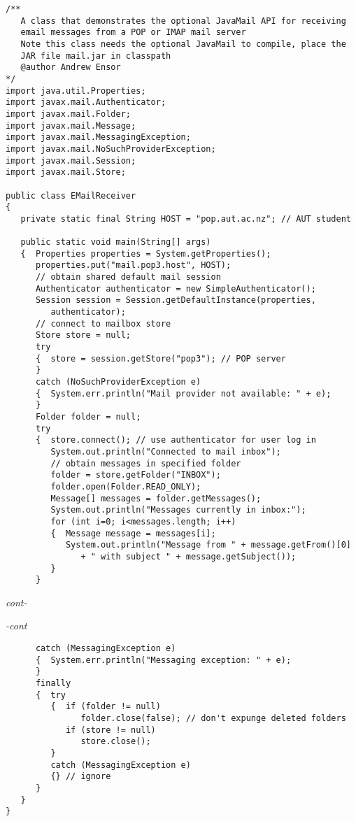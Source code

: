\begin{figure*}\begin{program}\begin{verbatim}
/**
   A class that demonstrates the optional JavaMail API for receiving
   email messages from a POP or IMAP mail server
   Note this class needs the optional JavaMail to compile, place the
   JAR file mail.jar in classpath
   @author Andrew Ensor
*/
import java.util.Properties;
import javax.mail.Authenticator;
import javax.mail.Folder;
import javax.mail.Message;
import javax.mail.MessagingException;
import javax.mail.NoSuchProviderException;
import javax.mail.Session;
import javax.mail.Store;

public class EMailReceiver
{
   private static final String HOST = "pop.aut.ac.nz"; // AUT student

   public static void main(String[] args)
   {  Properties properties = System.getProperties();
      properties.put("mail.pop3.host", HOST);
      // obtain shared default mail session
      Authenticator authenticator = new SimpleAuthenticator();
      Session session = Session.getDefaultInstance(properties,
         authenticator);
      // connect to mailbox store
      Store store = null;
      try
      {  store = session.getStore("pop3"); // POP server
      }
      catch (NoSuchProviderException e)
      {  System.err.println("Mail provider not available: " + e);
      }
      Folder folder = null;
      try
      {  store.connect(); // use authenticator for user log in
         System.out.println("Connected to mail inbox");
         // obtain messages in specified folder
         folder = store.getFolder("INBOX");
         folder.open(Folder.READ_ONLY);
         Message[] messages = folder.getMessages();
         System.out.println("Messages currently in inbox:");
         for (int i=0; i<messages.length; i++)
         {  Message message = messages[i];
            System.out.println("Message from " + message.getFrom()[0]
               + " with subject " + message.getSubject());
         }
      }
\end{verbatim}\hfill \emph{cont-}\end{program}\end{figure*}%
\begin{figure*}\begin{program}\emph{-cont}\begin{verbatim}
      catch (MessagingException e)
      {  System.err.println("Messaging exception: " + e);
      }
      finally
      {  try
         {  if (folder != null)
               folder.close(false); // don't expunge deleted folders
            if (store != null)
               store.close();
         }
         catch (MessagingException e)
         {} // ignore
      }
   }
}
\end{verbatim}\end{program}\end{figure*}

